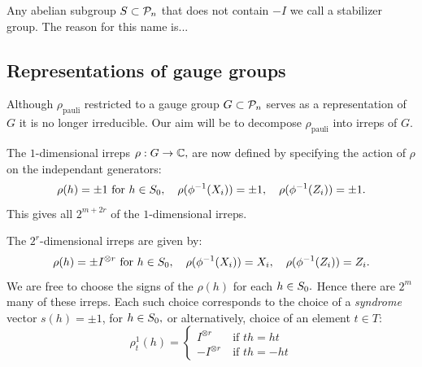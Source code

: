 \documentclass[12pt]{article}
\begin{document}
Any abelian subgroup $S\subset \mathcal{P}_n$
that does not contain $-I$ we call a stabilizer group.
The reason for this name is...



\subsection{Representations of gauge groups}

Although $\rho_{\mathrm{pauli}}$
restricted to a gauge group $G\subset\mathcal{P}_n$ serves as a representation
of $G$ it is no longer irreducible.
Our aim will be to decompose $\rho_{\mathrm{pauli}}$ into irreps of $G.$

The $1$-dimensional irreps $\rho:G\to \mathbb{C},$
are now defined by
specifying the action of $\rho$ on the independant generators:
$$
    \rho(h)=\pm 1\ \mbox{for}\ h\in S_0,
    \quad \rho(\phi^{-1}(X_i)) = \pm 1,\quad \rho(\phi^{-1}(Z_i)) = \pm 1.
$$
This gives all $2^{m+2r}$ of the $1$-dimensional irreps.

The $2^r$-dimensional irreps are given by:
$$
    \rho(h) = \pm I^{\otimes r}\ \mbox{for}\ h\in S_0,
    \quad \rho(\phi^{-1}(X_i)) = X_i,\quad \rho(\phi^{-1}(Z_i)) = Z_i.
$$
We are free to choose the signs of the $\rho(h)$ for each $h\in S_0.$
Hence there are $2^m$ many of these irreps.
Each such choice corresponds to the choice of a {\it syndrome} vector $s(h)=\pm 1$, for $h \in S_0,$
or alternatively, choice of an element $t\in T:$
$$
    \rho^1_t(h) = \left\{ \begin{array}{ll}
 I^{\otimes r}\ &\mbox{if $th=ht$}\\
 -I^{\otimes r}\ &\mbox{if $th=-ht$}\end{array} \right. %
$$

\end{document}
